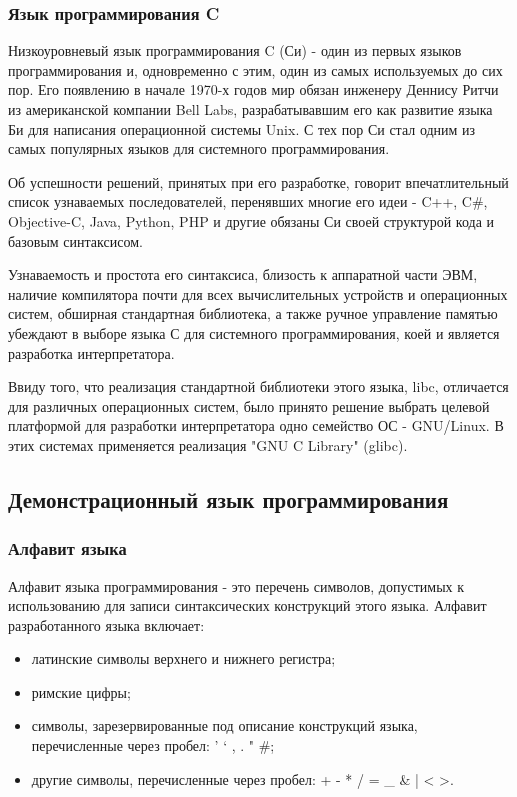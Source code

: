 \subsubsection{Язык программирования C}

Низкоуровневый язык программирования C (Си) - один из первых языков программирования и, одновременно с этим, один из самых используемых до сих пор. Его появлению в начале 1970-х годов мир обязан инженеру Деннису Ритчи из американской компании Bell Labs, разрабатывавшим его как развитие языка Би для написания операционной системы Unix. С тех пор Си стал одним из самых популярных языков для системного программирования.

Об успешности решений, принятых при его разработке, говорит впечатлительный список узнаваемых последователей, перенявших многие его идеи - C++, C\#, Objective-C, Java, Python, PHP и другие обязаны Си своей структурой кода и базовым синтаксисом.

Узнаваемость и простота его синтаксиса, близость к аппаратной части ЭВМ, наличие компилятора почти для всех вычислительных устройств и операционных систем, обширная стандартная библиотека, а также ручное управление памятью убеждают в выборе языка С для системного программирования, коей и является разработка интерпретатора.

Ввиду того, что реализация стандартной библиотеки этого языка, libc, отличается для различных операционных систем, было принято решение выбрать целевой платформой для разработки интерпретатора одно семейство ОС - GNU/Linux. В этих системах применяется реализация "GNU C Library" (glibc).





\subsection{Демонстрационный язык программирования}

\subsubsection{Алфавит языка}
Алфавит языка программирования - это перечень символов, допустимых к использованию для записи синтаксических конструкций этого языка. 
Алфавит разработанного языка включает:
\begin{itemize}
	\item латинские символы верхнего и нижнего регистра;
	\item римские цифры;
	\item символы, зарезервированные под описание конструкций языка, перечисленные через пробел: ' ` , . " \#;
	\item другие символы, перечисленные через пробел: + - * / = \_ \& | < >.
\end{itemize}

